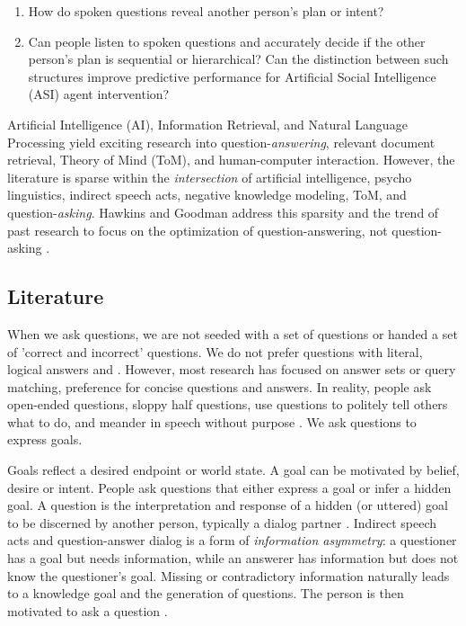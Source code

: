 \begin{enumerate}
    \item How do spoken questions reveal another person's plan or intent? 
    \item Can people listen to spoken questions and accurately decide if the other person's plan is sequential or hierarchical? Can the distinction between such structures improve predictive performance for Artificial Social Intelligence (ASI) agent intervention?
\end{enumerate}

Artificial Intelligence (AI), Information Retrieval, and Natural Language Processing yield exciting research into question-\emph{answering}, relevant document retrieval, Theory of Mind (ToM), and human-computer interaction. However, the literature is sparse within the  \emph{intersection} of artificial intelligence, psycho linguistics, indirect speech acts, negative knowledge modeling, ToM, and question-\emph{asking}. Hawkins and Goodman address this sparsity and the trend of past research to focus on the optimization of question-answering, not question-asking \citet{hawkins_goodman_2017}. 

\subsection{Literature}
When we ask questions, we are not seeded with a set of questions or handed a set of 'correct and incorrect' questions. We do not prefer questions with literal, logical answers \citet{rothe_lake_gureckis_2017} and \citet{clark_1979}. However, most research has focused on answer sets or query matching, preference for concise questions and answers. In reality, people ask open-ended questions, sloppy half questions, use questions to politely tell others what to do, and meander in speech without purpose \citet{brown_1980}. We ask questions to express goals. 

Goals reflect a desired endpoint or world state. A goal can be motivated by belief, desire or intent. People ask questions that either express a goal or infer a hidden goal. A question is the interpretation and response of a hidden (or uttered) goal to be discerned
by another person, typically a dialog partner \citet{hawkins_goodman_2017}. Indirect speech acts and question-answer dialog is a form of \emph{information asymmetry}: a questioner has a goal but needs information, while an answerer has information but does not know the questioner’s goal. Missing or contradictory information naturally leads to a knowledge goal and the generation of questions. The person is then motivated to ask a question \citet{alaimi_2020}. 


